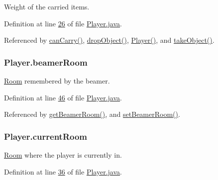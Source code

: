 Weight of the carried items. 



Definition at line \hyperlink{Player_8java_source_l00026}{26} of file \hyperlink{Player_8java_source}{Player.\-java}.



Referenced by \hyperlink{Player_8java_source_l00178}{can\-Carry()}, \hyperlink{Player_8java_source_l00195}{drop\-Object()}, \hyperlink{Player_8java_source_l00053}{Player()}, and \hyperlink{Player_8java_source_l00186}{take\-Object()}.

\hypertarget{classPlayer_a0d4ea9ed469b7daae679913aea85ea4b}{
\subsubsection[{beamer\-Room}]{ Player.\-beamer\-Room\hspace{0.3cm}{\ttfamily [private]}}}\label{classPlayer_a0d4ea9ed469b7daae679913aea85ea4b}


\hyperlink{classRoom}{Room} remembered by the beamer. 



Definition at line \hyperlink{Player_8java_source_l00046}{46} of file \hyperlink{Player_8java_source}{Player.\-java}.



Referenced by \hyperlink{Player_8java_source_l00151}{get\-Beamer\-Room()}, and \hyperlink{Player_8java_source_l00143}{set\-Beamer\-Room()}.

\hypertarget{classPlayer_a079f686d08c6d4c33e54d35862078fe3}{
\subsubsection[{current\-Room}]{ Player.\-current\-Room\hspace{0.3cm}{\ttfamily [private]}}}\label{classPlayer_a079f686d08c6d4c33e54d35862078fe3}


\hyperlink{classRoom}{Room} where the player is currently in. 



Definition at line \hyperlink{Player_8java_source_l00036}{36} of file \hyperlink{Player_8java_source}{Player.\-java}.



